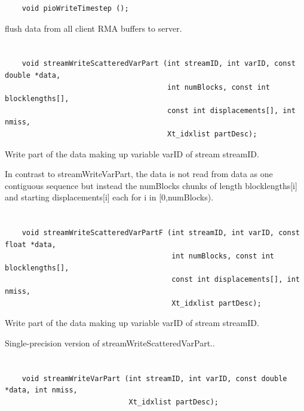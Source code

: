 \begin{verbatim}
    void pioWriteTimestep ();
\end{verbatim}

flush data from all client RMA buffers to server.


\section*{\tt {}}

\begin{verbatim}
    void streamWriteScatteredVarPart (int streamID, int varID, const double *data,
                                      int numBlocks, const int blocklengths[],
                                      const int displacements[], int nmiss,
                                      Xt_idxlist partDesc);
\end{verbatim}

Write part of the data making up
variable varID of stream streamID.

In contrast to streamWriteVarPart, the data is not read from data as one
contiguous sequence but instead the numBlocks chunks of length
blocklengths[i] and starting displacements[i] each for i in [0,numBlocks).


\section*{\tt {}}

\begin{verbatim}
    void streamWriteScatteredVarPartF (int streamID, int varID, const float *data,
                                       int numBlocks, const int blocklengths[],
                                       const int displacements[], int nmiss,
                                       Xt_idxlist partDesc);
\end{verbatim}

Write part of the data making up
variable varID of stream streamID.

Single-precision version of streamWriteScatteredVarPart..


\section*{\tt {}}

\begin{verbatim}
    void streamWriteVarPart (int streamID, int varID, const double *data, int nmiss,
                             Xt_idxlist partDesc);
\end{verbatim}

